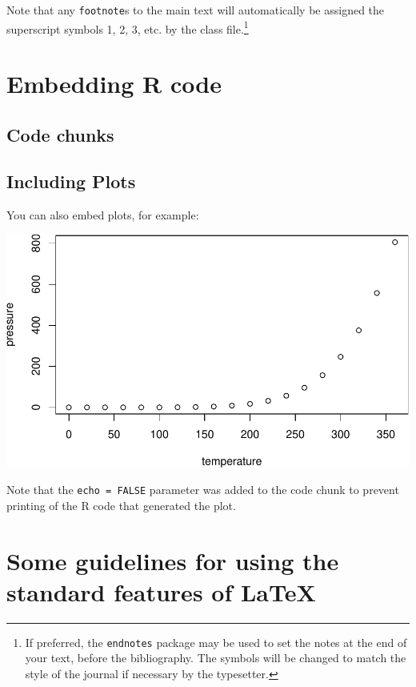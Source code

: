 \documentclass[]{interact}
\theoremstyle{plain}%
\theoremstyle{definition}
\theoremstyle{remark}
\begin{document}
Note that any \texttt{footnote}s to the main text will automatically be
assigned the superscript symbols 1, 2, 3, etc. by the class
file.\footnote{If preferred, the \texttt{endnotes} package may be used
  to set the notes at the end of your text, before the bibliography. The
  symbols will be changed to match the style of the journal if necessary
  by the typesetter.}

\hypertarget{embedding-r-code}{%
\section{Embedding R code}\label{embedding-r-code}}

\hypertarget{code-chunks}{%
\subsection{Code chunks}\label{code-chunks}}

\hypertarget{including-plots}{%
\subsection{Including Plots}\label{including-plots}}

You can also embed plots, for example:

\includegraphics[width=0.8\linewidth]{External-Validation-of-Bertens-COPD-Exacebration-Model_files/figure-latex/pressure-1}

Note that the \texttt{echo\ =\ FALSE} parameter was added to the code
chunk to prevent printing of the R code that generated the plot.

\hypertarget{some-guidelines-for-using-the-standard-features-of}{%
\section{\texorpdfstring{Some guidelines for using the standard features
of
\LaTeX}{Some guidelines for using the standard features of }}\label{some-guidelines-for-using-the-standard-features-of}}
\end{document}
